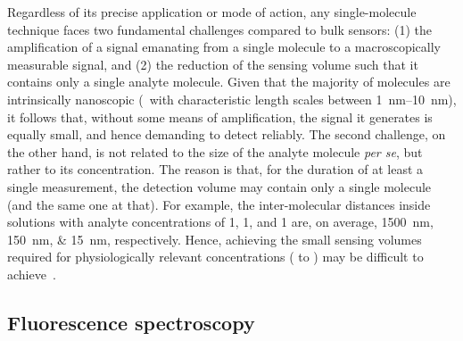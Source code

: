 Regardless of its precise application or mode of action, any single-molecule technique faces two fundamental
challenges compared to bulk sensors: (1) the amplification of a signal emanating from a single molecule to a
macroscopically measurable signal, and (2) the reduction of the sensing volume such that it contains only a
single analyte molecule. Given that the majority of molecules are intrinsically nanoscopic (\ie~with
characteristic length scales between \SIrange[range-phrase={ and }]{1}{10}{\nm}), it follows that, without
some means of amplification, the signal it generates is equally small, and hence demanding to detect reliably.
The second challenge, on the other hand, is not related to the size of the analyte molecule \textit{per se},
but rather to its concentration. The reason is that, for the duration of at least a single measurement, the
detection volume may contain only a single molecule (and the same one at that). For example, the
inter-molecular distances inside solutions with analyte concentrations of \SI{1}{\nM}, \SI{1}{\uM}, and
\SI{1}{\mM} are, on average, \SIlist{1500;150;15}{\nm}, respectively. Hence, achieving the small sensing
volumes required for physiologically relevant concentrations (\si{\uM} to \si{\mM}) may be difficult to
achieve~\cite{Zhu-2012}. 


\subsection{Fluorescence spectroscopy}
%

